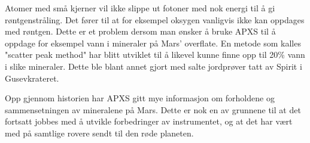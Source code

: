 Atomer med små kjerner vil ikke slippe ut fotoner med nok energi til å gi røntgenstråling.
Det fører til at for eksempel oksygen vanligvis ikke kan oppdages med røntgen.
Dette er et problem dersom man ønsker å bruke APXS til å oppdage for eksempel vann i mineraler på Mars' overflate.
En metode som kalles "scatter peak method" har blitt utviklet til å likevel kunne finne opp til 20\% vann i slike mineraler.
Dette ble blant annet gjort med salte jordprøver tatt av Spirit i Gusevkrateret.

Opp gjennom historien har APXS gitt mye informasjon om forholdene og sammensetningen av mineralene på Mars.
Dette er nok en av grunnene til at det fortsatt jobbes med å utvikle forbedringer av instrumentet, og at det har vært med på samtlige rovere sendt til den røde planeten.